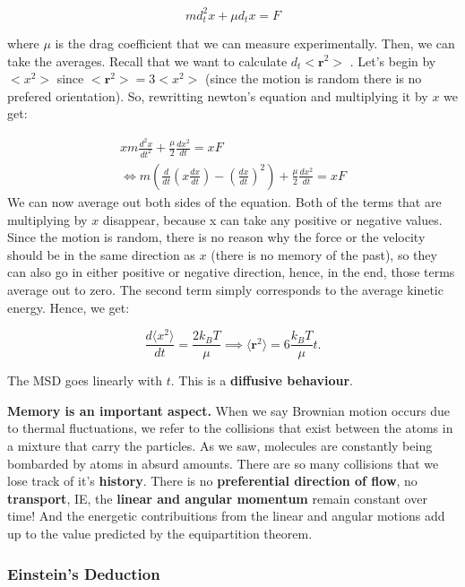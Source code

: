 \documentclass[a4paper]{article}
\begin{document}
\begin{equation}
	md_t^2x + \mu d_t x = F
\end{equation}

where $\mu$ is the drag coefficient that we can measure experimentally. Then, we can take the averages. Recall that we want to calculate $d_t<\mathbf{r}^2>$ . Let's begin by $<x^2>$ since $<\mathbf{r}^2>=3<x^2>$ (since the motion is random there is no prefered orientation). So, rewritting newton's equation and multiplying it by $x$ we get:

\begin{align}
	xm\frac{d^2x}{dt^2}+\frac{\mu}{2}\frac{dx^2}{dt} = xF\\
	\Leftrightarrow m\left(\frac{d}{dt}\left(x\frac{dx}{dt}\right)-\left(\frac{dx}{dt}\right)^2\right) +\frac{\mu}{2}\frac{dx^2}{dt} = xF
\end{align}
%
We can now average out both sides of the equation. Both of the terms that are multiplying by $x$ disappear, because x can take any positive or negative values. Since the motion is random, there is no reason why the force or the velocity should be in the same direction as $x$ (there is no memory of the past), so they can also go in either positive or negative direction, hence, in the end, those terms average out to zero. The second term simply corresponds to the average kinetic energy. Hence, we get:

\begin{equation}
	\frac{d\langle x^2\rangle }{dt} = \frac{2k_BT}{\mu} \implies \langle \mathbf{r}^2\rangle = 6\frac{k_BT}{\mu} t.
\end{equation}

The MSD goes linearly with $t$. This is a \textbf{diffusive behaviour}.

\textbf{Memory is an important aspect.} When we say Brownian motion occurs due to thermal fluctuations, we refer to the collisions that exist between the atoms in a mixture that carry the particles. As we saw, molecules are constantly being bombarded by atoms in absurd amounts. There are so many collisions that we lose track of it's \textbf{history}. There is no \textbf{preferential direction of flow}, no \textbf{transport}, IE, the \textbf{linear and angular momentum} remain constant over time! And the energetic contribuitions from the linear and angular motions add up to the value predicted by the equipartition theorem.

\subsubsection*{Einstein's Deduction}
\end{document}
